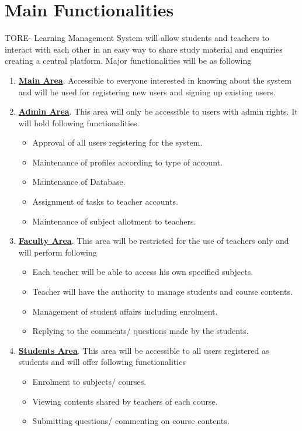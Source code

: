 \section{Main Functionalities}
TORE- Learning Management System will allow students and teachers to interact with each other in an easy way to share study material and enquiries creating a central platform. Major functionalities will be as following
\begin{enumerate}
    \item \textbf{\underline {Main Area}}. Accessible to everyone interested in knowing about the system and will be used for registering new users and signing up existing users.
    \item \textbf{\underline {Admin Area}}. This area will only be accessible to users with admin rights. It will hold following functionalities.
    \begin{itemize}
        \item Approval of all users registering for the system.
        \item Maintenance of profiles according to type of account.
        \item Maintenance of Database.
        \item Assignment of tasks to teacher accounts.
        \item Maintenance of subject allotment to teachers.
    \end{itemize}
    \item \textbf{\underline {Faculty Area}}. This area will be restricted for the use of teachers only and will perform following
     \begin{itemize}
        \item Each teacher will be able to access his own specified subjects.
        \item Teacher will have the authority to manage students and course contents.
        \item Management of student affairs including enrolment.
        \item Replying to the comments/ questions made by the students.
    \end{itemize}
    \item \textbf{\underline {Students Area}}. This area will be accessible to all users registered as students and will offer following functionalities
    \begin{itemize}
        \item Enrolment to subjects/ courses.
        \item Viewing contents shared by teachers of each course.
        \item Submitting questions/ commenting on course contents.
    \end{itemize}
\end{enumerate}
